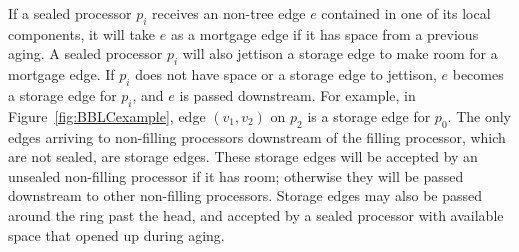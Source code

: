 If a sealed processor $p_i$ receives an non-tree edge $e$ contained in one of its local components, it will take $e$ as a  mortgage edge if it has space from a previous aging. A sealed processor $p_i$ will also jettison a storage edge to make room for a mortgage edge. If $p_i$ does not have space or a storage edge to jettison, $e$ becomes a storage edge for $p_i$, and $e$ is passed downstream.
For example, in Figure~\ref{fig:BBLCexample}, edge $(v_1,v_2)$ on $p_2$ is a storage edge for $p_0$. The only edges arriving to non-filling processors downstream of the filling processor, which are not sealed, are storage edges. These storage edges will be accepted by an unsealed non-filling processor if it has room; otherwise they will be passed downstream to other non-filling processors. Storage edges may also be passed around the ring past the head, and accepted by a sealed processor with available space that opened up during aging.

\fi
